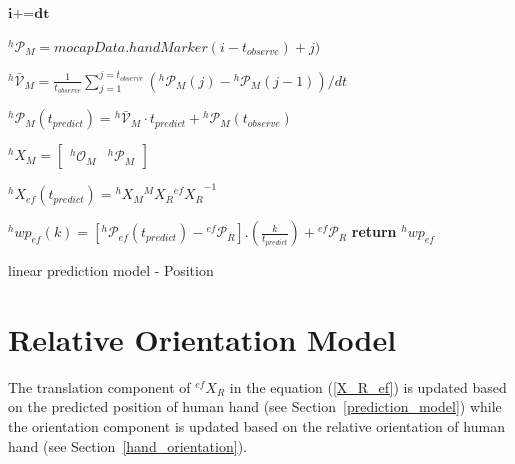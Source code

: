 \documentclass[a4paper, 12pt, oneside]{Thesis}  %
\begin{document}
\begin{algorithm}[H] \label{positionalgo}
	\DontPrintSemicolon
	\SetNoFillComment
	
	
	
	\textit{$\textbf{i+=dt}$} 
	
	{
		{
			${}^{h}\mathcal{P}_M= \textit{mocapData}.handMarker(i-t_{observe})+j)$	
		}
		
		${}^{h}\mathcal{\bar{V}}_{M} = \frac{1}{t_{observe}}{\sum_{j=1}^{j=t_{observe}} ({}^{h}\mathcal{P}_{M}(j)-{}^{h}\mathcal{P}_{M}(j-1))/dt }$\newline 
		
		${}^{h}\mathcal{P}_M(t_{predict}) = {}^{h}\mathcal{\bar{V}}_{M} \cdot t_{predict}  + {}^{h}\mathcal{P}_{M}(t_{observe})$ %
		
		
		${}^{h}{X}_M= \begin{bmatrix} {}^{h}\mathcal{O}_{M} &  {}^{h}\mathcal{P}_M	\end{bmatrix}$ \newline
		
		${}^{h}{X}_{ef}(t_{predict}) =  {}^{h}{X}_M  {}^{M}{X}_R {{}^{ef}{X}_R}^{-1}$ \newline
		
		
		{
			{
				${}^{h}wp_{ef}(k) = [{}^{h}\mathcal{P}_{ef}(t_{predict}) - {}^{ef}\mathcal{P}_{R}] . (\frac{k}{t_{predict}})  + {}^{ef}\mathcal{P}_{R} $ 
			}	
			\textbf{return} $ {}^{h}wp_{ef} $
		}
	}
	\caption{linear prediction model - Position}
\end{algorithm}


\clearpage

\section{Relative Orientation Model}\label{relOri}
The translation component of ${}^{ef}{X}_R $ in the equation (\ref{X_R_ef}) is updated based on the predicted position of human hand (see Section~\ref{prediction_model}) while the orientation component is updated based on the relative orientation of human hand (see Section~\ref{hand_orientation}).
\end{document}
